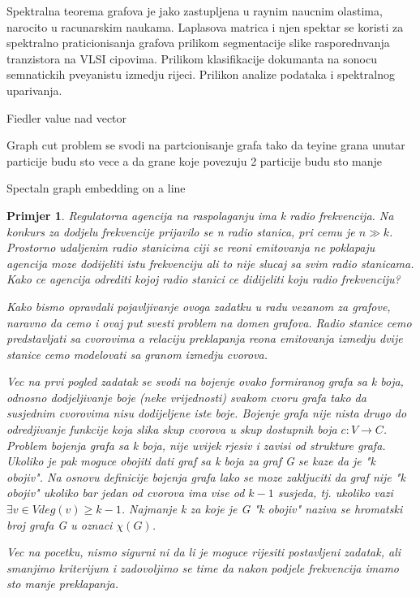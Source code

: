 \documentclass[11pt]{article}
\newtheorem{example}{Primjer}
\begin{document}
    Spektralna teorema grafova je jako zastupljena u raynim naucnim olastima, narocito u racunarskim naukama.
    Laplasova matrica i njen spektar se koristi za spektralno praticionisanja grafova prilikom segmentacije slike rasporednvanja tranzistora na VLSI cipovima. Prilikom klasifikacije dokumanta na sonocu semnatickih pveyanistu izmedju rijeci.
    Prilikon analize podataka i spektralnog uparivanja.

    Fiedler value nad vector

    Graph cut problem se svodi na partcionisanje grafa tako da teyine grana unutar particije budu sto vece a da grane koje povezuju 2 particije budu sto manje

    Spectaln graph embedding on a line

    \begin{example}
        Regulatorna agencija na raspolaganju ima k radio frekvencija. Na konkurs za dodjelu frekvencije prijavilo se n radio stanica, pri cemu je $n \gg k$.
        Prostorno udaljenim radio stanicima ciji se reoni emitovanja ne poklapaju agencija moze dodijeliti istu frekvenciju ali to nije slucaj sa svim radio stanicama.
        Kako ce agencija odrediti kojoj radio stanici ce didijeliti koju radio frekvenciju?

        Kako bismo opravdali pojavljivanje ovoga zadatku u radu vezanom za grafove, naravno da cemo i ovaj put svesti problem na domen grafova.
        Radio stanice cemo predstavljati sa cvorovima a relaciju preklapanja reona emitovanja izmedju dvije stanice cemo modelovati sa granom izmedju cvorova.

        Vec na prvi pogled zadatak se svodi na bojenje ovako formiranog grafa sa k boja, odnosno dodjeljivanje boje (neke vrijednosti) svakom cvoru grafa tako da
        susjednim cvorovima nisu dodijeljene iste boje. Bojenje grafa nije nista drugo do odredjivanje funkcije koja slika skup cvorova u skup dostupnih boja $ c : V \to C$.
        Problem bojenja grafa sa k boja, nije uvijek rjesiv i zavisi od strukture grafa. Ukoliko je pak moguce obojiti dati graf sa k boja za graf G se
        kaze da je "k obojiv". Na osnovu definicije bojenja grafa lako se moze zakljuciti da graf nije "k obojiv" ukoliko bar jedan od cvorova ima vise od $k-1$ susjeda, tj.
        ukoliko vazi $\exists v \in V deg(v) \geq k-1$. Najmanje k za koje je G "k obojiv" naziva se hromatski broj grafa G u oznaci $\chi(G)$.

        Vec na pocetku, nismo sigurni ni da li je moguce rijesiti postavljeni zadatak, ali smanjimo kriterijum i zadovoljimo se time da nakon podjele frekvencija imamo sto manje preklapanja.
        

\end{example}
\end{document}
